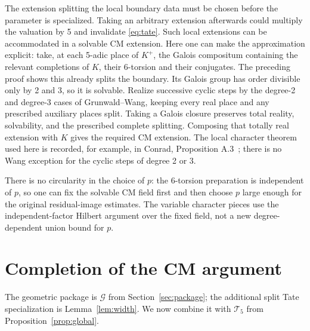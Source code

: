\documentclass[11pt,a4paper]{article}
\theoremstyle{definition}\newtheorem{definition}[theorem]{Definition}
\theoremstyle{remark}\newtheorem*{remark}{Remark}
\newcommand{\Ginput}{\mathcal G}
\newcommand{\Tinput}{\mathcal T_5}
\begin{document}
The extension splitting the local boundary data must be chosen before the
parameter is specialized. Taking an arbitrary extension afterwards could
multiply the valuation by 5 and invalidate \eqref{eq:tate}. Such local
extensions can be accommodated in a solvable CM extension. Here one can
make the approximation explicit: take, at each 5-adic place of $K^+$, the
Galois compositum containing the relevant completions of $K$, their
6-torsion and their conjugates. The preceding proof shows this already
splits the boundary. Its Galois group has order divisible only by 2 and 3,
so it is solvable. Realize successive cyclic steps by the degree-2 and
degree-3 cases of Grunwald--Wang, keeping every real place and any
prescribed auxiliary places split. Taking a Galois closure preserves
total reality, solvability, and the prescribed complete splitting.
Composing that totally real extension with $K$ gives the required CM
extension. The local character theorem used here is recorded, for
example, in Conrad, Proposition A.3~\cite{Conrad}; there is no Wang
exception for the cyclic steps of degree 2 or 3.

There is no circularity in the choice of $p$: the 6-torsion preparation
is independent of $p$, so one can fix the solvable CM field first and
then choose $p$ large enough for the original residual-image estimates.
The variable character pieces use the
independent-factor Hilbert argument over the fixed field, not a new
degree-dependent union bound for $p$.

\section{Completion of the CM argument}
\label{sec:consequence}

The geometric package is $\Ginput$ from Section~\ref{sec:package};
the additional split Tate specialization is Lemma~\ref{lem:width}.
We now combine it with $\Tinput$ from Proposition~\ref{prop:global}.
\end{document}
